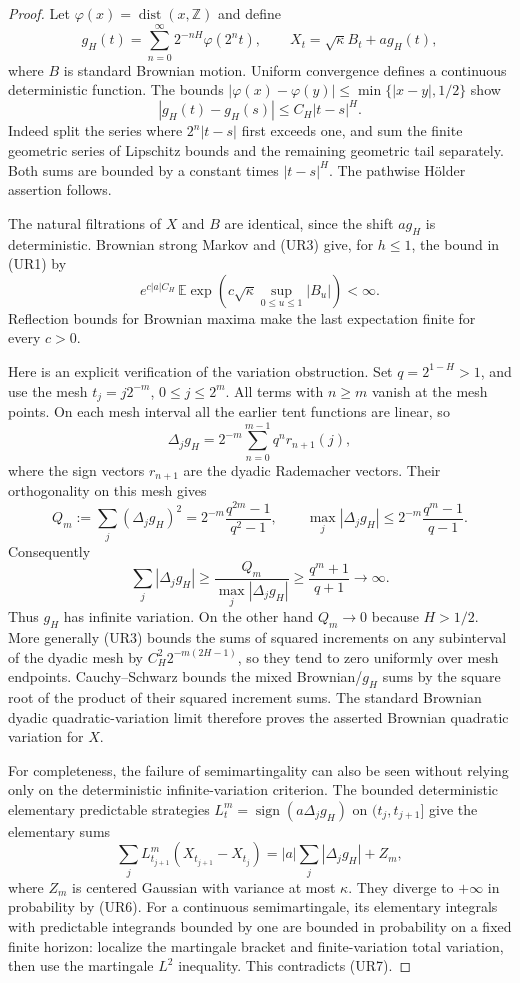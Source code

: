 \documentclass[11pt]{article}
\theoremstyle{definition}\newtheorem{definition}[theorem]{Definition}
\theoremstyle{remark}\newtheorem{remark}[theorem]{Remark}
\begin{document}
\begin{proof}
Let $\varphi(x)=\operatorname{dist}(x,\mathbb Z)$ and define
\[
 g_H(t)=\sum_{n=0}^{\infty}2^{-nH}\varphi(2^nt),
 \qquad X_t=\sqrt\kappa B_t+a g_H(t),
 \tag{UR2}
\]
where $B$ is standard Brownian motion. Uniform convergence defines a
continuous deterministic function. The bounds
$|\varphi(x)-\varphi(y)|\le\min\{|x-y|,1/2\}$ show
\[
 |g_H(t)-g_H(s)|\le C_H|t-s|^H.
 \tag{UR3}
\]
Indeed split the series where $2^n|t-s|$ first exceeds one, and sum the
finite geometric series of Lipschitz bounds and the remaining geometric
tail separately. Both sums are bounded by a constant times $|t-s|^H$.
The pathwise H\"older assertion follows.

The natural filtrations of $X$ and $B$ are identical, since the shift
$ag_H$ is deterministic. Brownian strong Markov and (UR3) give, for
$h\le1$, the bound in (UR1) by
\[
 e^{c|a|C_H}\,
 \mathbb E\exp\!\left(c\sqrt\kappa\sup_{0\le u\le1}|B_u|\right)<\infty.
\]
Reflection bounds for Brownian maxima make the last expectation finite
for every $c>0$.

Here is an explicit verification of the variation obstruction. Set
$q=2^{1-H}>1$, and use the mesh $t_j=j2^{-m}$, $0\le j\le2^m$.
All terms with $n\ge m$ vanish at the mesh points. On each mesh interval
all the earlier tent functions are linear, so
\[
 \Delta_j g_H
 =2^{-m}\sum_{n=0}^{m-1}q^n r_{n+1}(j),
 \tag{UR4}
\]
where the sign vectors $r_{n+1}$ are the dyadic Rademacher vectors.
Their orthogonality on this mesh gives
\[
 Q_m:=\sum_j(\Delta_jg_H)^2
   =2^{-m}\frac{q^{2m}-1}{q^2-1},\qquad
 \max_j|\Delta_jg_H|
   \le2^{-m}\frac{q^m-1}{q-1}.
 \tag{UR5}
\]
Consequently
\[
 \sum_j|\Delta_jg_H|
 \ge\frac{Q_m}{\max_j|\Delta_jg_H|}
 \ge\frac{q^m+1}{q+1}\longrightarrow\infty.
 \tag{UR6}
\]
Thus $g_H$ has infinite variation. On the other hand $Q_m\to0$ because
$H>1/2$. More generally (UR3) bounds the sums of squared increments on
any subinterval of the dyadic mesh by $C_H^2 2^{-m(2H-1)}$, so they tend
to zero uniformly over mesh endpoints. Cauchy--Schwarz bounds the mixed
Brownian/$g_H$ sums by the square root of the product of their squared
increment sums. The standard Brownian dyadic quadratic-variation limit
therefore proves the asserted Brownian quadratic variation for $X$.

For completeness, the failure of semimartingality can also be seen
without relying only on the deterministic infinite-variation criterion.
The bounded deterministic elementary predictable strategies
$L^m_t=\operatorname{sign}(a\Delta_j g_H)$ on
$(t_j,t_{j+1}]$ give the elementary sums
\[
 \sum_jL^m_{t_{j+1}}(X_{t_{j+1}}-X_{t_j})
   = |a|\sum_j|\Delta_jg_H|+Z_m,
 \tag{UR7}
\]
where $Z_m$ is centered Gaussian with variance at most $\kappa$.
They diverge to $+\infty$ in probability by (UR6). For a continuous
semimartingale, its elementary integrals with predictable integrands
bounded by one are bounded in probability on a fixed finite horizon:
localize the martingale bracket and finite-variation total variation,
then use the martingale $L^2$ inequality. This contradicts (UR7).
\end{proof}
\end{document}
